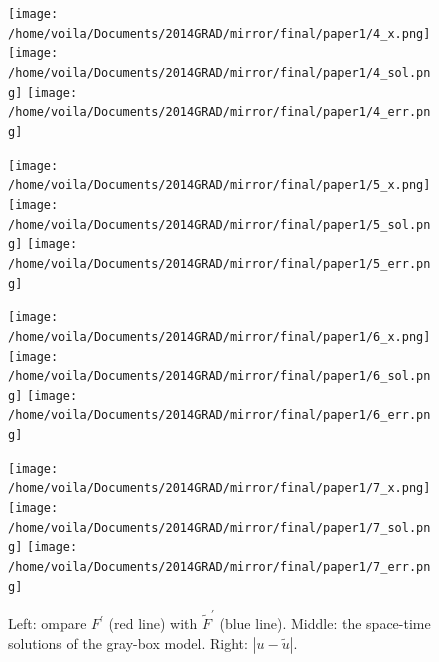 \documentclass[a4paper,onecolumn]{article}
\theoremstyle{remark}
\begin{document}
\vspace{-1cm}
\begin{figure}[H]\begin{center}
    \texttt{[image: /home/voila/Documents/2014GRAD/mirror/final/paper1/4\_x.png]}
    \texttt{[image: /home/voila/Documents/2014GRAD/mirror/final/paper1/4\_sol.png]}
    \texttt{[image: /home/voila/Documents/2014GRAD/mirror/final/paper1/4\_err.png]}
    \label{fig:sol compare}
\end{center}\end{figure}
\vspace{-1cm}
\begin{figure}[H]\begin{center}
    \texttt{[image: /home/voila/Documents/2014GRAD/mirror/final/paper1/5\_x.png]}
    \texttt{[image: /home/voila/Documents/2014GRAD/mirror/final/paper1/5\_sol.png]}
    \texttt{[image: /home/voila/Documents/2014GRAD/mirror/final/paper1/5\_err.png]}
    \label{fig:sol compare}
\end{center}\end{figure}
\vspace{-1cm}
\begin{figure}[H]\begin{center}
    \texttt{[image: /home/voila/Documents/2014GRAD/mirror/final/paper1/6\_x.png]}
    \texttt{[image: /home/voila/Documents/2014GRAD/mirror/final/paper1/6\_sol.png]}
    \texttt{[image: /home/voila/Documents/2014GRAD/mirror/final/paper1/6\_err.png]}
    \label{fig:sol compare}
\end{center}\end{figure}
\vspace{-1cm}
\begin{figure}[H]\begin{center}
    \texttt{[image: /home/voila/Documents/2014GRAD/mirror/final/paper1/7\_x.png]}
    \texttt{[image: /home/voila/Documents/2014GRAD/mirror/final/paper1/7\_sol.png]}
    \texttt{[image: /home/voila/Documents/2014GRAD/mirror/final/paper1/7\_err.png]}
    \label{fig:sol compare}
    \caption{Left: ompare $F^\prime$ (red line) with $\tilde{F}^\prime$ (blue line). 
             Middle: the space-time solutions of the gray-box model.
             Right: $\left|u-\tilde{u}\right|$.}
\end{center}\end{figure}
\end{document}
